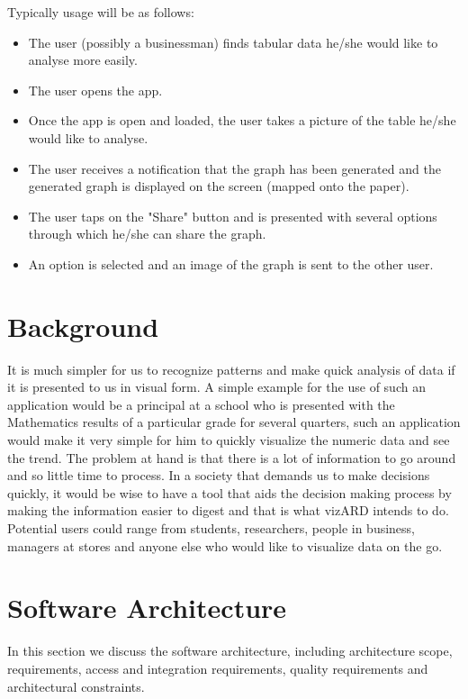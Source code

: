 \documentclass[a4paper,12pt]{article}
\begin{document}
Typically usage will be as follows:
\begin{itemize}
	\item The user (possibly a businessman) finds tabular data he/she would like to analyse more easily.
	\item The user opens the app.
	\item Once the app is open and loaded, the user takes a picture of the table he/she would like to analyse.
	\item The user receives a notification that the graph has been generated and the generated graph is displayed on the screen (mapped onto the paper).
	\item The user taps on the "Share" button and is presented with several options through which he/she can share the graph.
	\item An option is selected and an image of the graph is sent to the other user.
\end{itemize}

\newpage
\section{Background}

It is much simpler for us to recognize patterns and make quick analysis of data if it is presented to us in visual form. A simple example for the use of such an application would be a principal at a school who is presented with the Mathematics results of a particular grade for several quarters, such an application would make it very simple for him to quickly visualize the numeric data and see the trend.
\newline
\newline
The problem at hand is that there is a lot of information to go around and so little time to process. In a society that demands us to make decisions quickly, it would be wise to have a tool that aids the decision making process by making the information easier to digest and that is what vizARD intends to do.
\newline
\newline
Potential users could range from students, researchers, people in business, managers at stores and anyone else who would like to visualize data on the go.
		

\newpage
\section{Software Architecture}
In this section we discuss the software architecture, including architecture scope, requirements, access and integration requirements, quality requirements and architectural constraints.
\end{document}
